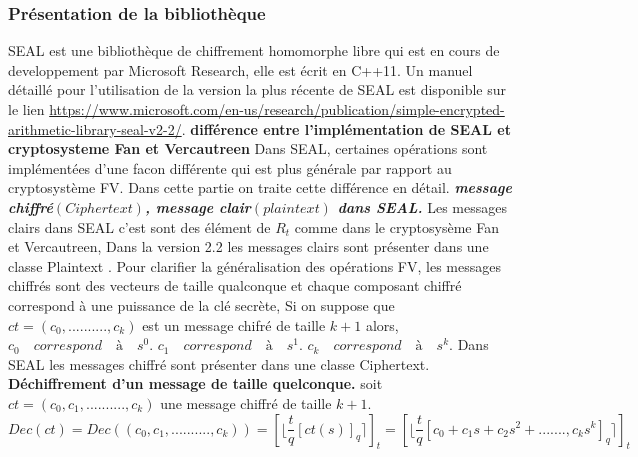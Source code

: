 \documentclass[a4paper,12pt]{article}
\begin{document}
\subsubsection{Présentation de la bibliothèque}
SEAL est une bibliothèque de chiffrement homomorphe libre qui est en cours de developpement par Microsoft Research, elle est écrit en C++11.
Un manuel détaillé pour l'utilisation de la version la plus récente de SEAL est disponible sur le lien \url{https://www.microsoft.com/en-us/research/publication/simple-encrypted-arithmetic-library-seal-v2-2/}. \newline
 \newline
\textbf{différence entre l'implémentation de SEAL et cryptosysteme Fan et Vercautreen}  \newline
Dans SEAL, certaines opérations sont implémentées d'une facon différente qui est plus générale par rapport au cryptosystème FV.\newline
Dans cette partie on traite cette différence en détail.\newline
\textbf{\textit{message chiffré$(Ciphertext)$, message clair$(plaintext)$ dans SEAL.}}\newline
Les messages clairs dans SEAL c'est sont des élément de $R_t$ comme dans le cryptosysème Fan et Vercautreen,
Dans la version 2.2 les messages clairs sont présenter dans une classe Plaintext .\newline
Pour clarifier la généralisation des opérations FV, les messages chiffrés sont des vecteurs de taille qualconque et chaque composant chiffré correspond à une puissance de la clé secrète, Si on suppose que $ct = (c_0,..........,c_k)$ est un message chifré de taille $k+1$ alors,\newline
$c_0\quad correspond \quad à \quad s^0.$\newline
$c_1\quad correspond \quad à \quad s^1.$\newline
$c_k\quad correspond \quad à \quad s^k.$
\newline
 Dans SEAL les messages chiffré sont présenter dans une classe Ciphertext.\newline
 \textbf{Déchiffrement d'un message de taille quelconque.}\newline
soit $ct = (c_0, c_1, .........., c_k)$ une message chiffré de taille $k+1.$\newline
$Dec(ct) = Dec((c_0, c_1, .........., c_k)) = [\lfloor\dfrac{t}{q}[ct(s)]_q\rceil]_t = [\lfloor\dfrac{t}{q}[c_0 + c_1s+c_2s^2+.......,c_ks^k]_q\rceil]_t$\newline
\end{document}
